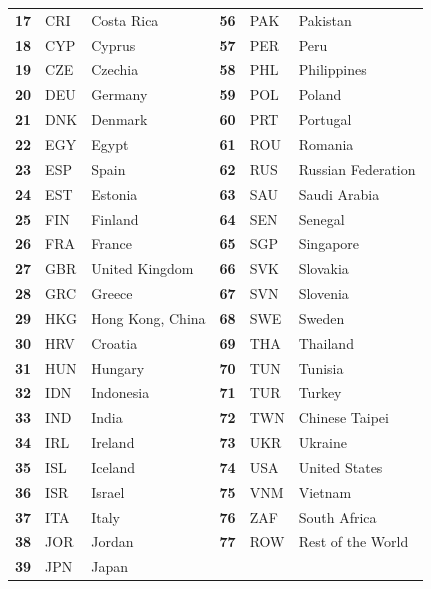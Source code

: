\documentclass[preprint, 3p,
authoryear]{elsarticle} %
\begin{document}
\begin{table}[H]
\begin{tabular}[t]{>{}r|l>{}l||>{}r|ll}
\textbf{17} & CRI & Costa Rica & \textbf{56} & PAK & Pakistan\\
\textbf{18} & CYP & Cyprus & \textbf{57} & PER & Peru\\
\textbf{19} & CZE & Czechia & \textbf{58} & PHL & Philippines\\
\textbf{20} & DEU & Germany & \textbf{59} & POL & Poland\\
\textbf{21} & DNK & Denmark & \textbf{60} & PRT & Portugal\\
\textbf{22} & EGY & Egypt & \textbf{61} & ROU & Romania\\
\textbf{23} & ESP & Spain & \textbf{62} & RUS & Russian Federation\\
\textbf{24} & EST & Estonia & \textbf{63} & SAU & Saudi Arabia\\
\textbf{25} & FIN & Finland & \textbf{64} & SEN & Senegal\\
\textbf{26} & FRA & France & \textbf{65} & SGP & Singapore\\
\textbf{27} & GBR & United Kingdom & \textbf{66} & SVK & Slovakia\\
\textbf{28} & GRC & Greece & \textbf{67} & SVN & Slovenia\\
\textbf{29} & HKG & Hong Kong, China & \textbf{68} & SWE & Sweden\\
\textbf{30} & HRV & Croatia & \textbf{69} & THA & Thailand\\
\textbf{31} & HUN & Hungary & \textbf{70} & TUN & Tunisia\\
\textbf{32} & IDN & Indonesia & \textbf{71} & TUR & Turkey\\
\textbf{33} & IND & India & \textbf{72} & TWN & Chinese Taipei\\
\textbf{34} & IRL & Ireland & \textbf{73} & UKR & Ukraine\\
\textbf{35} & ISL & Iceland & \textbf{74} & USA & United States\\
\textbf{36} & ISR & Israel & \textbf{75} & VNM & Vietnam\\
\textbf{37} & ITA & Italy & \textbf{76} & ZAF & South Africa\\
\textbf{38} & JOR & Jordan & \textbf{77} & ROW & Rest of the World\\
\textbf{39} & JPN & Japan & \textbf{} &  & \\
\bottomrule
\end{tabular}
\end{table}
\end{document}
